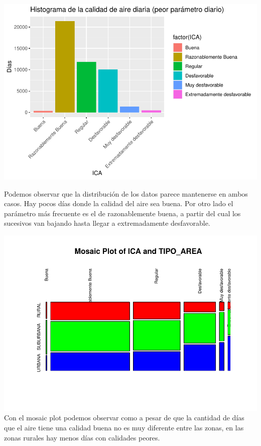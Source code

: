 \documentclass[notspecified,article,submit,moreauthors,pdftex]{Definitions/mdpi}
\begin{document}
\includegraphics{ProyectoAED2023_files/figure-latex/unnamed-chunk-44-1.pdf}

Podemos observar que la distribución de los datos parece mantenerse en
ambos casos. Hay pocos días donde la calidad del aire sea buena. Por
otro lado el parámetro más frecuente es el de razonablemente buena, a
partir del cual los sucesivos van bajando hasta llegar a extremadamente
desfavorable.

\includegraphics{ProyectoAED2023_files/figure-latex/unnamed-chunk-45-1.pdf}
Con el mosaic plot podemos observar como a pesar de que la cantidad de
días que el aire tiene una calidad buena no es muy diferente entre las
zonas, en las zonas rurales hay menos días con calidades peores.
\end{document}
